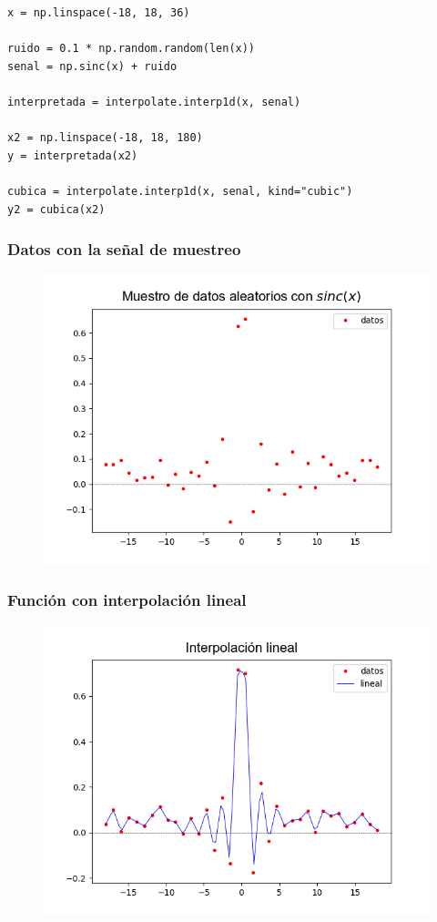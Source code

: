 {\begin{frame}
\begin{lstlisting}[caption= Datos iniciales para la comparación, style= FormattedNumber, basicstyle=\linespread{0.9}\ttfamily=\small, columns=fullflexible]
x = np.linspace(-18, 18, 36)

ruido = 0.1 * np.random.random(len(x))
senal = np.sinc(x) + ruido

interpretada = interpolate.interp1d(x, senal)

x2 = np.linspace(-18, 18, 180)
y = interpretada(x2)

cubica = interpolate.interp1d(x, senal, kind="cubic")
y2 = cubica(x2)
\end{lstlisting}
\end{frame}
\begin{frame}
\frametitle{Datos con la señal de muestreo}
\begin{figure}
\includegraphics[scale=0.65]{Imagenes/Interpolacion_sinc_01}
\end{figure}
\end{frame}
\begin{frame}
\frametitle{Función con interpolación lineal}
\begin{figure}
\includegraphics[scale=0.55]{Imagenes/Interpolacion_sinc_02}

\end{figure}
\end{frame}}
